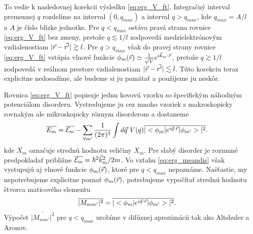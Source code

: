 To vedie k nasledovnej korekcii výsledku \eqref{eq:erg_V_ft}. Integračný interval premennej $q$ rozdelíme na interval $(0, q_{max})$ a interval $q > q_{max}$, kde $q_{max}=A/l$ a $A$ je číslo blízke jednotke.
Pre $q < q_{max}$ ostáva pravá strana rovnice \eqref{eq:erg_V_ft} bez zmeny, pretože $q \lesssim 1/l$ zodpovedá medzielektrónovým vzdialenostiam $|\vec{r}-\vec{r'}| \gtrsim l$.
Pre $q > q_{max}$  však do pravej strany rovnice \eqref{eq:erg_V_ft} vstúpia vlnové funkcie $\phi_m(\vec{r}) \simeq \frac{1}{\sqrt V}e^{i\vec{k}_m\cdot\vec{r}}$, pretože $q \gtrsim 1/l$
zodpovedá v reálnom prestore vzdialenostiam $|\vec{r}-\vec{r'}| \lesssim l$. Túto korekciu teraz explicitne nedosadíme, ale budeme si ju pamätať a použijeme ju neskôr.

Rovnica \eqref{eq:erg_V_ft} popisuje jednu kovovú vzorku so špecifickým náhodným potenciálom disorderu. Vystredujeme ju cez mnoho vzoriek s makroskopicky rovnakým ale mikroskopicky rôznym disorderom a dostaneme
\begin{equation}
\label{eq:erg_meandis}
 \overline{E_m}=\overline{\mathcal{E}_m}-\sum_{\forall m'} \frac{1}{(2\pi)^{3}} \int d\vec{q}\ V(q) \overline{|<\phi_m|e^{i\vec{q}\cdot\vec{r}}|\phi_{m'}>|^2} \text{.}
\end{equation}
kde $\overline{X_m}$ označuje strednú hodnotu veličiny $X_m$. Pre slabý disorder je rozumné predpokladať približne $\overline{\mathcal{E}_m} = \hbar^2 \vec{k}_m^2/2m$.
Vo vzťahu \eqref{eq:erg_meandis} však vystupujú aj vlnové funkcie
$\phi_m(\vec{r})$, ktoré pre $q < q_{max}$ nepoznáme. Našťastie, my nepotrebujeme explicitne poznať $\phi_m(\vec{r})$, potrebujeme vypočítať strednú hodnotu štvorca maticového elementu
\begin{equation}
\label{eq:aa_matrix_element}
\overline{| M_{mm'}|^2} =\overline{|<\phi_m|e^{i\vec{q}\cdot\vec{r}}|\phi_{m'}>|^2} \text{.}
\end{equation}
Výpočet $\overline{| M_{mm'}|^2}$ pre $q < q_{max}$ urobíme v difúznej aproximácii tak ako Altshuler a Aronov.

